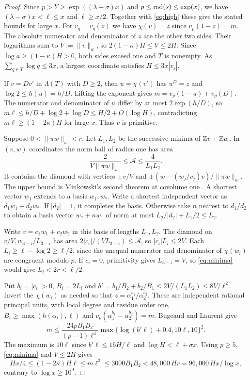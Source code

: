 \begin{proof}
Since $p>Y\ge\exp((\lambda-\sigma)x)$ and $p\le\operatorname{rad}(s)\le\exp(x)$,
we have $(\lambda-\sigma)x<\ell\le x$ and $\ell\ge x/2$.
Together with \eqref{eq:high} these give the stated bounds for large $x$.
For $v_q=v_q(z)$ we have $\chi(v)=z$ since $v_p(1-z)=m$.
The absolute numerator and denominator of $z$ are the other two sides.
Their logarithms sum to $V:=\|v\|_w$, so $2(1-\kappa)H\le V\le2H$.
Since $\log a\ge(1-\kappa)H>0$, both sides exceed one and $T$ is nonempty.
As $\sum_{q\in T}\log q\le3x$, a largest coordinate satisfies $H\le3x|v_j|$.

If $v=Dv'$ in $\Lambda(T)$ with $D\ge2$, then $u=\chi(v')$ has
$u^D=z$ and $\log2\le h(u)=h/D$. Lifting the exponent gives
$m=v_p(1-u)+v_p(D)$. The numerator and denominator of $u$ differ by at
most $2\exp(h/D)$, so $m\ell\le h/D+\log2+\log D\le H/2+O(\log H)$,
contradicting $m\ell\ge(1-2\kappa)H$ for large $x$. Thus $v$ is primitive.

Suppose $0<\|\pi w\|_w<r$. Let $L_1,L_2$ be the successive minima
of $\mathbb Z v+\mathbb Z w$. In $(v,w)$ coordinates the norm ball of radius one has area
\begin{equation}\label{eq:minima}
 \frac2{V\|\pi w\|_w}\le\mathcal A\le\frac4{L_1L_2}.
\end{equation}
It contains the diamond with vertices $\pm v/V$ and
$\pm(w-(w_j/v_j)v)/\|\pi w\|_w$. The upper bound is Minkowski's
second theorem at covolume one \cite[p.~2, (2)]{Malikiosis2010}.
A shortest vector $w_1$ extends to a basis $w_1,w_*$. Write a shortest
independent vector as $d_1w_1+d_2w_*$. If $|d_2|=1$, it completes the
basis. Otherwise take $n$ nearest to $d_1/d_2$ to obtain a basis vector
$w_*+nw_1$ of norm at most $L_2/|d_2|+L_1/2\le L_2$.

Write $v=c_1w_1+c_2w_2$ in this basis of lengths $L_1,L_2$.
The diamond on $v/V,w_{3-i}/L_{3-i}$ has area
$2|c_i|/(VL_{3-i})\le\mathcal A$, so $|c_i|L_i\le2V$.
Each $L_i\ge\ell-\log2\ge\ell/2$, since the unequal numerator and
denominator of $\chi(w_i)$ are congruent modulo $p$.
If $c_i=0$, primitivity gives $L_{3-i}=V$, so \eqref{eq:minima}
would give $L_i<2r<\ell/2$.

Put $b_i=|c_i|>0$, $B_i=2L_i$ and
$b'=b_1/B_2+b_2/B_1\le2V/(L_1L_2)\le8V/\ell^2$.
Invert the $\chi(w_i)$ as needed so that $z=\alpha_1^{b_1}/\alpha_2^{b_2}$.
These are independent rational principal units, with local degree and
residue order one, $B_i\ge\max(h(\alpha_i),\ell)$ and
$v_p(\alpha_1^{b_1}-\alpha_2^{b_2})=m$. Bugeaud and Laurent
\cite[Corollary~2, p.~315]{BL96} give
\[
 m\le\frac{24pB_1B_2}{(p-1)\ell^4}
       \max\{\log(b'\ell)+0.4,10\ell,10\}^2 .
\]
The maximum is $10\ell$ since $b'\ell\le16H/\ell$ and
$\log H<\ell+\sigma x$. Using $p\ge5$, \eqref{eq:minima} and $V\le2H$ gives
\[
 Hx/4\le(1-2\kappa)H\ell\le m\ell^2\le3000B_1B_2
 <48{,}000\,Hr=96{,}000\,Hx/\log x ,
\]
contrary to $\log x\ge10^9$.
\end{proof}

